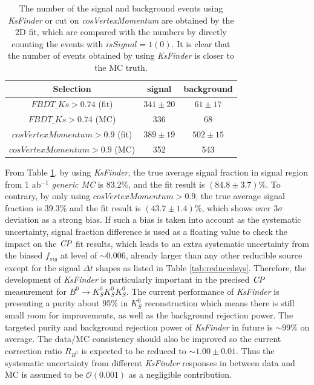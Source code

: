 \begin{table}[htpb]
	\centering
	\caption{The number of the signal and background events using \textit{KsFinder} or cut on \textit{cosVertexMomentum} are obtained by the 2D fit, which are compared with the numbers by directly counting the events with $isSignal=1 (0)$.
	It is clear that the number of events obtained by using \textit{KsFinder} is closer to the MC truth.}
	\label{tab:ksbias}
	\begin{tabular}{c| c |c}
		\hline
		Selection & signal  & background \\
		\hline
		${FBDT\_Ks>0.74}$ (fit) & $341\pm20$ & $61\pm17$ \\
		${FBDT\_Ks>0.74}$ (MC) & 336 & 68\\
		${cosVertexMomentum>0.9}$ (fit) & $389\pm19$ & $502\pm15$\\
		${cosVertexMomentum>0.9}$ (MC) & 352 & 543\\
		\hline
	\end{tabular}
\end{table}

From Table \ref{tab:ksbias}, by using \textit{KsFinder}, the true average signal fraction in signal region from 1 ab$^{-1}$ \textit{generic MC} is 83.2\%, and the fit result is $(84.8\pm3.7)\%$. To contrary, by only using ${cosVertexMomentum>0.9}$, the true average signal fraction is 39.3\% and the fit result is $(43.7\pm1.4)\%$, which shows over $3\sigma$ deviation as a strong bias. If such a bias is taken into account as the systematic uncertainty, signal fraction difference is used as a floating value to check the impact on the $\it{CP}$ fit results, which leads to an extra systematic uncertainty from the biased $f_{sig}$ at level of $\sim 0.006$, already larger than any other reducible source except for the signal $\Delta t$ shapes as listed in Table \ref{tab:reducedsys}. Therefore, the development of \textit{KsFinder} is particularly important in the precised $\it{CP}$ measurement for $B^0 \to K_S^0  K_S^0  K_S^0$. The current performance of \textit{KsFinder} is presenting a purity about 95\% in $K_S^0$ reconstruction which means there is still small room for improvements, as well as the background rejection power. The targeted purity and background rejection power of \textit{KsFinder} in future is $\sim 99\%$ on average. The data/MC consistency should also be improved so the current correction ratio $R_{B^0}$ is expected to be reduced to $\sim 1.00\pm 0.01$. Thus the systematic uncertainty from different \textit{KsFinder} responses in between data and MC is assumed to be $\mathcal{O}(0.001)$ as a negligible contribution. 



